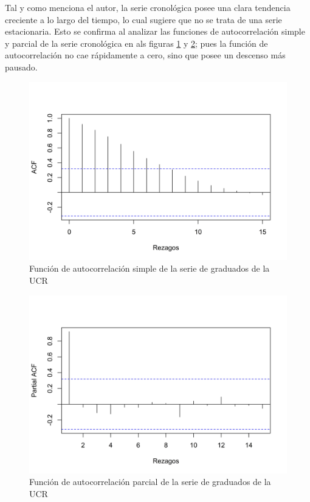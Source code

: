 \documentclass[
]{article}
\begin{document}
Tal y como menciona el autor, la serie cronológica posee una clara
tendencia creciente a lo largo del tiempo, lo cual sugiere que no se
trata de una serie estacionaria. Esto se confirma al analizar las
funciones de autocorrelación simple y parcial de la serie cronológica en
als figuras \ref{fig:auto_ucr1} y \ref{fig:parcial_ucr1}; pues la
función de autocorrelación no cae rápidamente a cero, sino que posee un
descenso más pausado.

\begin{figure}[!h]
\includegraphics[width=1\linewidth,height=1\textheight]{Tesis_files/figure-latex/auto_ucr1-1} \caption{Función de autocorrelación simple de la serie de graduados de la UCR}\label{fig:auto_ucr1}
\end{figure}

\begin{figure}[!h]
\includegraphics[width=1\linewidth,height=1\textheight]{Tesis_files/figure-latex/parcial_ucr1-1} \caption{Función de autocorrelación parcial de la serie de graduados de la UCR}\label{fig:parcial_ucr1}
\end{figure}
\end{document}
